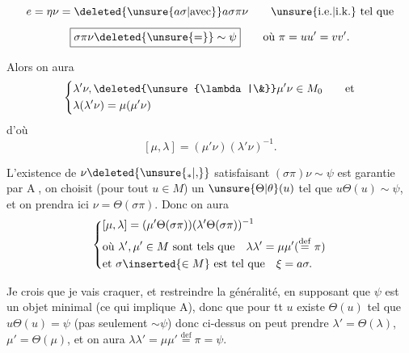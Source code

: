 
\[
e=\eta\nu=\deleted{\unsure{a\sigma|\text{avec}}}a\sigma\pi\nu\qquad\text{\unsure{i.e.|i.k.} tel que}
\]
\[
\boxed{\sigma\pi\nu\deleted{\unsure{=}}\sim\psi}\qquad\text{où }\pi=uu'=vv'.
\]

Alors on aura
\[
\left\{\begin{aligned}&\lambda'\nu,\deleted{\unsure{\lambda|\&}}\mu'\nu\in M_0\qquad\text{et}\\ &\lambda(\lambda'\nu)=\mu(\mu'\nu)\end{aligned}\right.
\]
d'où
\[
[\mu,\lambda]=(\mu'\nu)(\lambda'\nu)^{-1}.
\]

L'existence de $\nu\deleted{\unsure{{}_{*}|{,}}}$ satisfaisant $(\sigma\pi)\nu\sim\psi$ est garantie par \textcircled{A}, on choisit (pour tout $u\in M$) un $\unsure{\Theta|\theta}(u)$ tel que $u\Theta(u)\sim\psi$, et on prendra ici $\nu=\Theta(\sigma\pi)$. Donc on aura
\[
\left\{\begin{aligned}&[\mu,\lambda]=(\mu'\Theta(\sigma\pi))(\lambda'\Theta(\sigma\pi))^{-1}\\ &\text{où }\lambda',\mu'\in M\ \text{sont tels que}\quad\lambda\lambda'=\mu\mu'(\overset{\mathrm{def}}{=}\pi)\\ &\text{et }\sigma\inserted{\in M}\ \text{est tel que}\quad\xi=a\sigma.\end{aligned}\right.
\]

Je crois que je vais craquer, et restreindre la généralité, en supposant  que $\psi$ est un objet minimal (ce qui implique A), donc que pour tt $u$ existe $\Theta(u)$ tel que $u\Theta(u)=\psi$ (pas seulement $\sim\psi$) donc ci-dessus on peut prendre $\lambda'=\Theta(\lambda)$, $\mu'=\Theta(\mu)$, et on aura $\lambda\lambda'=\mu\mu'\overset{\mathrm{def}}{=}\pi=\psi$.

